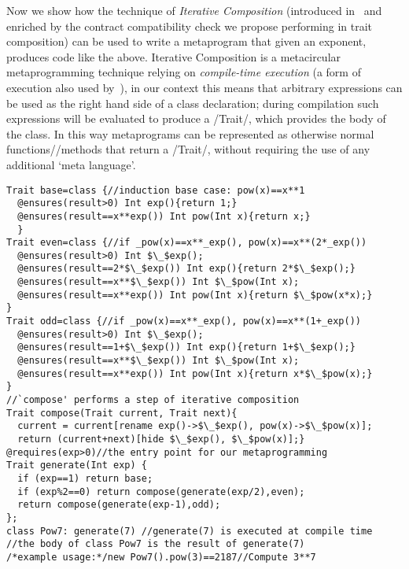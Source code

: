 Now we show how the technique of \emph{Iterative Composition} (introduced in~\cite{servetto2014meta} and
enriched by the contract compatibility check we propose performing in trait composition) 
can be used to write a metaprogram that given an exponent, produces code like the above.
Iterative Composition is a metacircular metaprogramming technique relying on \emph{compile-time execution} (a form of execution also used by~\cite{sheard2002template}),
in our context this means that arbitrary expressions can be used as the right hand side of a class declaration; during compilation such expressions will be evaluated to produce a /Trait/, which provides the body of the class. In this way metaprograms can be represented as otherwise normal functions//methods that return a /Trait/, without requiring the use of any additional `meta language'.
 

\begin{lstlisting}
Trait base=class {//induction base case: pow(x)==x**1
  @ensures(result>0) Int exp(){return 1;}  
  @ensures(result==x**exp()) Int pow(Int x){return x;}
  }
Trait even=class {//if _pow(x)==x**_exp(), pow(x)==x**(2*_exp())
  @ensures(result>0) Int $\_$exp();
  @ensures(result==2*$\_$exp()) Int exp(){return 2*$\_$exp();}
  @ensures(result==x**$\_$exp()) Int $\_$pow(Int x);
  @ensures(result==x**exp()) Int pow(Int x){return $\_$pow(x*x);}
}
Trait odd=class {//if _pow(x)==x**_exp(), pow(x)==x**(1+_exp())
  @ensures(result>0) Int $\_$exp();
  @ensures(result==1+$\_$exp()) Int exp(){return 1+$\_$exp();}
  @ensures(result==x**$\_$exp()) Int $\_$pow(Int x);
  @ensures(result==x**exp()) Int pow(Int x){return x*$\_$pow(x);}
}
//`compose' performs a step of iterative composition
Trait compose(Trait current, Trait next){
  current = current[rename exp()->$\_$exp(), pow(x)->$\_$pow(x)];
  return (current+next)[hide $\_$exp(), $\_$pow(x)];}
@requires(exp>0)//the entry point for our metaprogramming
Trait generate(Int exp) {
  if (exp==1) return base;
  if (exp%2==0) return compose(generate(exp/2),even);
  return compose(generate(exp-1),odd);
};
class Pow7: generate(7) //generate(7) is executed at compile time
//the body of class Pow7 is the result of generate(7)
/*example usage:*/new Pow7().pow(3)==2187//Compute 3**7
\end{lstlisting}
